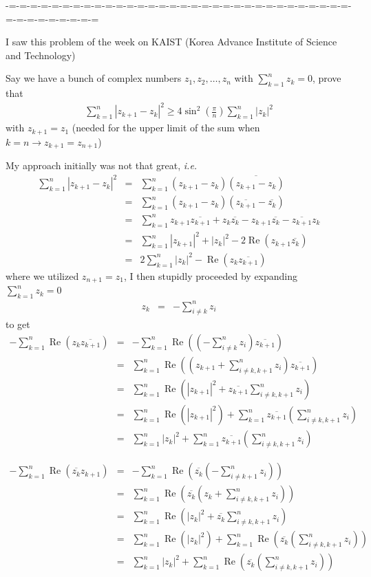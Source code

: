\documentclass[aps,preprint,preprintnumbers,nofootinbib,showpacs,prd]{revtex4-1}
\newcommand{\ie}{{\it i.e.} }
\newcommand{\nbea}{\begin{eqnarray*}}
\newcommand{\neea}{\end{eqnarray*}}
\DeclareMathOperator{\re}{Re}
\begin{document}
-=-=-=-=-=-=-=-=-=-=-=-=-=-=-=-=-=-=-=-=-=-=-=-=-=-=-=-=-=-=-=-=-=-=-=-=-=-=-=-=-=

I saw this problem of the week on KAIST (Korea Advance Institute of Science and Technology)

Say we have a bunch of complex numbers $z_1,z_2,\ldots,z_n$ with $\sum_{k=1}^n z_k = 0$, prove that
%
\nbea
\sum_{k=1}^{n} \left | z_{k+1} - z_k\right |^2 \ge 4\sin^2\left ( \frac{\pi}{n}\right ) \sum_{k=1}^n \left | z_k\right |^2
\neea
%
with $z_{k+1} = z_1$ (needed for the upper limit of the sum when $k = n \to z_{k+1} = z_{n+1}$)

My approach initially was not that great, \ie
%
\nbea
\sum_{k=1}^{n} \left | z_{k+1} - z_k\right |^2 & = & \sum_{k=1}^{n} (z_{k+1} - z_k)\overline{(z_{k+1} - z_k)} \\
& = & \sum_{k=1}^{n} (z_{k+1} - z_k)(\overline{z_{k+1}} - \overline{z_k}) \\
& = & \sum_{k=1}^{n} z_{k+1}\overline{z_{k+1}} + z_k\overline{z_k} - z_{k+1}\overline{z_k} -  \overline{z_{k+1}}z_k\\
& = & \sum_{k=1}^{n} |z_{k+1}|^2 + |z_k|^2 - 2 \re(z_{k+1}\overline{z_k})\\
& = & 2 \sum_{k=1}^{n} |z_k|^2 - \re(z_{k}\overline{z_{k+1}})
\neea
%
where we utilized $z_{n+1} = z_1$, I then stupidly proceeded by expanding $\sum_{k=1}^n z_k = 0$
%
\nbea
z_k & = & -\sum_{i\neq k}^n z_i
\neea
%
to get
%
\nbea
-\sum_{k=1}^{n} \re(z_{k}\overline{z_{k+1}}) & = & -\sum_{k=1}^{n} \re \left ( \left (-\sum_{i\neq k}^n z_i \right )\overline{z_{k+1}} \right ) \\
& = & \sum_{k=1}^{n} \re \left (\left ( z_{k+1} + \sum_{i\neq k,k+1}^n z_i \right )\overline{z_{k+1}} \right ) \\
& = & \sum_{k=1}^{n} \re \left (|z_{k+1}|^2 + \overline{z_{k+1}}\sum_{i\neq k,k+1}^n z_i \right ) \\
& = & \sum_{k=1}^{n} \re \left ( |z_{k+1}|^2 \right ) + \sum_{k=1}^{n}\overline{z_{k+1}}\left (\sum_{i\neq k,k+1}^n z_i \right ) \\
& = & \sum_{k=1}^{n} |z_{k}|^2 + \sum_{k=1}^{n}\overline{z_{k+1}}\left (\sum_{i\neq k,k+1}^n z_i \right )
\neea
%

%
\nbea
-\sum_{k=1}^{n} \re(\overline{z_{k}} z_{k+1}) & = & -\sum_{k=1}^{n} \re \left ( \overline{z_k} \left (-\sum_{i\neq k+1}^n z_i \right ) \right ) \\
& = & \sum_{k=1}^{n} \re \left (\overline{z_{k}}\left ( z_k + \sum_{i\neq k,k+1}^n z_i \right ) \right ) \\
& = & \sum_{k=1}^{n} \re \left (|z_k|^2 + \overline{z_k}\sum_{i\neq k,k+1}^n z_i \right ) \\
& = & \sum_{k=1}^{n} \re \left ( |z_k|^2 \right ) + \sum_{k=1}^{n}\re \left (\overline{z_k}\left (\sum_{i\neq k,k+1}^n z_i \right ) \right )\\
& = & \sum_{k=1}^{n} |z_{k}|^2 + \sum_{k=1}^{n}\re \left (\overline{z_k}\left (\sum_{i\neq k,k+1}^n z_i \right ) \right )
\neea
%
\end{document}
